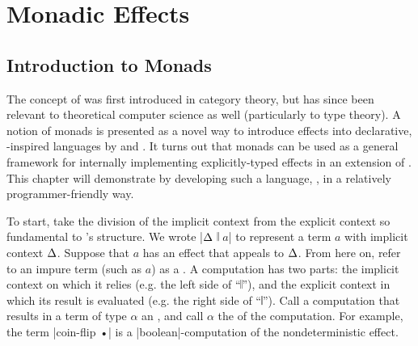 \chapter{Monadic Effects}
\label{ch:ME}

\section{Introduction to Monads}
\label{sec:intro-monads}

The concept of  was first introduced in category theory, but has since been relevant to theoretical computer science as well (particularly to type theory).
A notion of monads is presented as a novel way to introduce effects into declarative, \lc-inspired languages by \cite{MOGGI199155} and \cite{Plotkin2001}.
It turns out that monads can be used as a general framework for internally implementing explicitly-typed effects in an extension of \LangA.
This chapter will demonstrate by developing such a language, \LangC, in a relatively programmer-friendly way.

To start, take the division of the implicit context from the explicit context so fundamental to \LangB's structure.
We wrote \code|$\Delta$ 𝄁 $a$| to represent a term $a$ with implicit context $\Delta$.
Suppose that $a$ has an effect that appeals to $\Delta$.
From here on, refer to an impure term (such as $a$) as a .
A computation has two parts:
the implicit context on which it relies (e.g. the left side of ``$𝄁$''), and
the explicit context in which its result is evaluated (e.g. the right side of ``$𝄁$'').
Call a computation that results in a term of type $α$ an ,
and call $α$ the  of the computation.
For example, the \LangB term \code|coin-flip •| is a \code|boolean|-computation of the nondeterministic effect.


